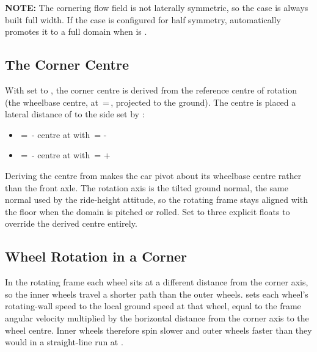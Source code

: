 \textbf{NOTE:} The cornering flow field is not laterally symmetric, so the case is always built full width. If the case is configured for half symmetry,  automatically promotes it to a full domain when  is .

\subsection{The Corner Centre}
With  set to , the corner centre is derived from the reference centre of rotation  (the wheelbase centre, at \,=\,, projected to the ground). The centre is placed a lateral distance of  to the side set by :
\begin{itemize}
    \item {}\,=\, - centre at  with \,=\,\,-\,

    \item {}\,=\, - centre at  with \,=\,\,+\,
\end{itemize}
Deriving the centre from  makes the car pivot about its wheelbase centre rather than the front axle. The rotation axis is the tilted ground normal, the same normal used by the ride-height attitude, so the rotating frame stays aligned with the floor when the domain is pitched or rolled. Set  to three explicit floats to override the derived centre entirely.

\subsection{Wheel Rotation in a Corner}
In the rotating frame each wheel sits at a different distance from the corner axis, so the inner wheels travel a shorter path than the outer wheels.  sets each wheel's rotating-wall speed to the local ground speed at that wheel, equal to the frame angular velocity multiplied by the horizontal distance from the corner axis to the wheel centre. Inner wheels therefore spin slower and outer wheels faster than they would in a straight-line run at .


